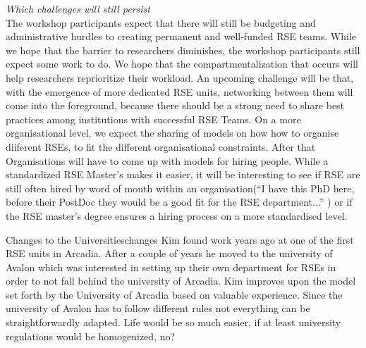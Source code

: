 \documentclass{eceasst}
\begin{document}
\emph{Which challenges will still persist}\\
The workshop participants expect that there will still be budgeting and administrative hurdles to creating
permanent and well-funded RSE teams.
While we hope that the barrier to researchers diminishes, the workshop participants
still expect some work to do. We hope that the compartmentalization that occurs will help researchers reprioritize their workload.
An upcoming challenge will be that, with the emergence of more dedicated RSE units,
networking between them will come into the foreground, because there should be a strong need to share best practices
among institutions with successful RSE Teams.
On a more organisational level, we expect the sharing of models on how how to organise diiferent RSEs, to fit the different organisational constraints.
After that Organisations will have to come up with models for hiring people.
While a standardized RSE Master's makes it easier, it will be interesting to see if
RSE are still often hired by word of mouth within an organisation(``I have this PhD here, before their PostDoc they would be a good fit for the RSE department...'' ) or if the RSE master's degree ensures a hiring process on a more standardised level.

\begin{story}{Changes to the Universities}{changes}
Kim found work years ago at one of the first RSE units in Arcadia. After a couple of years he moved to the university of
Avalon which was interested in setting up their own department for RSEs in order to not fall behind the university of Arcadia.
Kim improves upon the model set forth by the University of Arcadia based on valuable experience. Since the university
of Avalon has to follow different rules not everything can be straightforwardly adapted. Life would be so much easier,
if at least university regulations would be homogenized, no?
\end{story}
\end{document}

